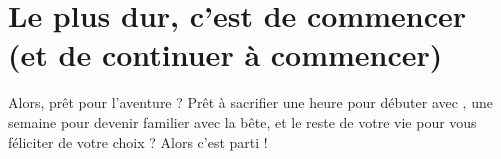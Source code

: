 \section{Le plus dur, c'est de commencer (et de continuer à commencer)}

Alors, prêt pour l'aventure ? Prêt à sacrifier une heure pour débuter avec \vim, une semaine pour devenir familier avec la bête, et le reste de votre vie pour vous féliciter de votre choix ? Alors c'est parti !


